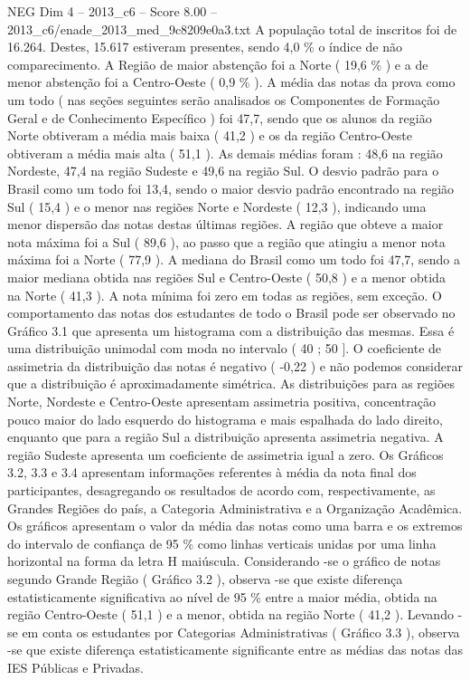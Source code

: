 \begin{textsample}{NEG Dim 4 – 2013\_c6 – Score 8.00 – 2013\_c6/enade\_2013\_med\_9c8209e0a3.txt}
A população total de inscritos foi de 16.264.
Destes, 15.617 estiveram presentes, sendo 4,0 \% o índice de não comparecimento.
A Região de maior abstenção foi a Norte ( 19,6 \% ) e a de menor abstenção foi a Centro-Oeste ( 0,9 \% ).
A média das notas da prova como um todo ( nas seções seguintes serão analisados os Componentes de Formação Geral e de Conhecimento Específico ) foi 47,7, sendo que os alunos da região Norte obtiveram a média mais baixa ( 41,2 ) e os da região Centro-Oeste obtiveram a média mais alta ( 51,1 ).
As demais médias foram : 48,6 na região Nordeste, 47,4 na região Sudeste e 49,6 na região Sul.
O desvio padrão para o Brasil como um todo foi 13,4, sendo o maior desvio padrão encontrado na região Sul ( 15,4 ) e o menor nas regiões Norte e Nordeste ( 12,3 ), indicando uma menor dispersão das notas destas últimas regiões.
A região que obteve a maior nota máxima foi a Sul ( 89,6 ), ao passo que a região que atingiu a menor nota máxima foi a Norte ( 77,9 ).
A mediana do Brasil como um todo foi 47,7, sendo a maior mediana obtida nas regiões Sul e Centro-Oeste ( 50,8 ) e a menor obtida na Norte ( 41,3 ).
A nota mínima foi zero em todas as regiões, sem exceção.
O comportamento das notas dos estudantes de todo o Brasil pode ser observado no Gráfico 3.1 que apresenta um histograma com a distribuição das mesmas.
Essa é uma distribuição unimodal com moda no intervalo ( 40 ; 50 ].
O coeficiente de assimetria da distribuição das notas é negativo ( -0,22 ) e não podemos considerar que a distribuição é aproximadamente simétrica.
As distribuições para as regiões Norte, Nordeste e Centro-Oeste apresentam assimetria positiva, concentração pouco maior do lado esquerdo do histograma e mais espalhada do lado direito, enquanto que para a região Sul a distribuição apresenta assimetria negativa.
A região Sudeste apresenta um coeficiente de assimetria igual a zero.
Os Gráficos 3.2, 3.3 e 3.4 apresentam informações referentes à média da nota final dos participantes, desagregando os resultados de acordo com, respectivamente, as Grandes Regiões do país, a Categoria Administrativa e a Organização Acadêmica.
Os gráficos apresentam o valor da média das notas como uma barra e os extremos do intervalo de confiança de 95 \% como linhas verticais unidas por uma linha horizontal na forma da letra H maiúscula.
Considerando -se o gráfico de notas segundo Grande Região ( Gráfico 3.2 ), observa -se que existe diferença estatisticamente significativa ao nível de 95 \% entre a maior média, obtida na região Centro-Oeste ( 51,1 ) e a menor, obtida na região Norte ( 41,2 ).
Levando -se em conta os estudantes por Categorias Administrativas ( Gráfico 3.3 ), observa -se que existe diferença estatisticamente significante entre as médias das notas das IES Públicas e Privadas.

\end{textsample}
